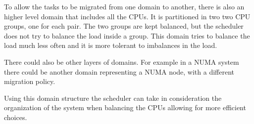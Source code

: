 To allow the tasks to be migrated from one domain to another, there is also an higher level domain that includes all the CPUs. It is partitioned in two two CPU groups, one for each pair. The two groups are kept balanced, but the scheduler does not try to balance the load inside a group. This domain tries to balance the load much less often and it is more tolerant to imbalances in the load.

There could also be other layers of domains. For example in a NUMA system there could be another domain representing a NUMA node, with a different migration policy.

Using this domain structure the scheduler can take in consideration the organization of the system when balancing the CPUs allowing for more efficient choices.